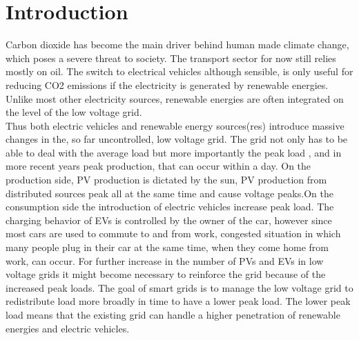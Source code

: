 \documentclass[a4paper]{article}
\begin{document}
\section{Introduction}
Carbon dioxide has become the main driver behind human made climate change, which poses a severe threat to society. 
The transport sector for now still relies mostly on oil. The switch to electrical vehicles although sensible, is only 
useful for reducing CO2 emissions if the electricity is generated by renewable energies. Unlike most other electricity 
sources, renewable energies are often integrated on the level of the low voltage grid.\\
Thus both electric vehicles and renewable energy sources(res) introduce massive changes in the, so far uncontrolled, 
low voltage grid. The grid not only has to be able to deal with the average load but more importantly the peak load 
, and in more recent years peak production, that can occur within a day. 
On the production side, PV production is dictated by the sun, PV production from distributed sources peak 
all at the same time and cause voltage peaks.On the consumption side the introduction of electric vehicles increase peak load.
The charging behavior of EVs is controlled by the owner of the car, however 
since most cars are used to commute to and from work, congested situation in which many people plug in their car at the same 
time, when they come home from work, can occur. 
For further increase in the number of PVs and EVs in low voltage grids it might become 
necessary to reinforce the grid because of the increased peak loads.
The goal of smart grids is to manage the low voltage grid to redistribute load more broadly in time to have a lower peak load. 
The lower peak load means that the existing grid can handle a higher penetration of renewable energies and electric vehicles.  \\
\end{document}
